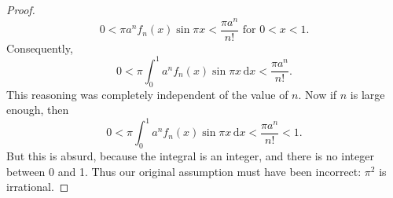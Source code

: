 \documentclass{article}
\begin{document}
\begin{proof}
\begin{equation*}
    0 < \pi a^nf_n(x)\sin\pi x < \frac{\pi a^n}{n!} \text{ for } 0 < x < 1.
  \end{equation*} Consequently, \begin{equation*}
    0 < \pi \int_0^1 a^nf_n(x)\sin\pi x \,\mathrm{d}x < \frac{\pi a^n}{n!}.
  \end{equation*} This reasoning was completely independent of the value of
  $n$. Now if $n$ is large enough, then \begin{equation*}
    0 < \pi \int_0^1 a^nf_n(x)\sin\pi x \,\mathrm{d}x < \frac{\pi a^n}{n!} < 1.
  \end{equation*} But this is absurd, because the integral is an integer, and
  there is no integer between 0 and 1. Thus our original assumption must have
  been incorrect: $\pi^2$ is irrational.
\end{proof}
\end{document}
